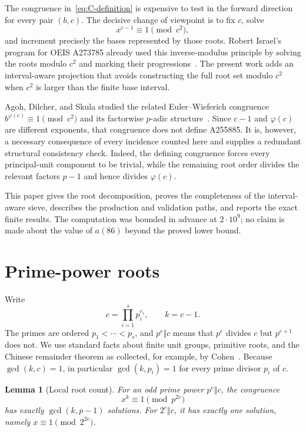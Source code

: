 \documentclass[11pt]{article}
\newtheorem{lemma}[theorem]{Lemma}
\begin{document}
The congruence in~\eqref{eq:C-definition} is expensive to test in the forward
direction for every pair $(b,c)$.  The decisive change of viewpoint is to fix
$c$, solve
\begin{equation}\label{eq:root-congruence}
 x^{c-1}\equiv1\pmod{c^2},
\end{equation}
and increment precisely the bases represented by those roots.  Robert
Israel's program for OEIS A273785 already used this inverse-modulus principle
by solving the roots modulo $c^2$ and marking their progressions~\cite{oeis-a273785}.
The present work adds an interval-aware projection that avoids constructing
the full root set modulo $c^2$ when $c^2$ is larger than the finite base
interval.

Agoh, Dilcher, and Skula studied the related Euler--Wieferich congruence
$b^{\varphi(c)}\equiv1\pmod{c^2}$ and its factorwise $p$-adic
structure~\cite{agoh-dilcher-skula}.  Since $c-1$ and $\varphi(c)$ are
different exponents, that congruence does not define A255885.  It is,
however, a necessary consequence of every incidence counted here and supplies
a redundant structural consistency check.  Indeed, the defining congruence
forces every principal-unit component to be trivial, while the remaining
root order divides the relevant factors $p-1$ and hence divides
$\varphi(c)$.

This paper gives the root decomposition, proves the completeness of the
interval-aware sieve, describes the production and validation paths, and
reports the exact finite results.  The computation was bounded in advance at
$2\cdot10^9$; no claim is made about the value of $a(86)$ beyond the proved
lower bound.

\section{Prime-power roots}

Write
\[
 c=\prod_{i=1}^s p_i^{e_i},\qquad k=c-1.
\]
The primes are ordered $p_1<\cdots<p_s$, and $p^e\Vert c$ means that $p^e$
divides $c$ but $p^{e+1}$ does not.  We use standard facts about finite unit
groups, primitive roots, and the Chinese remainder theorem as collected, for
example, by Cohen~\cite{cohen}.
Because $\gcd(k,c)=1$, in particular $\gcd(k,p_i)=1$ for every prime divisor
$p_i$ of $c$.

\begin{lemma}[Local root count]\label{lem:local-roots}
For an odd prime power $p^e\Vert c$, the congruence
\[
 x^k\equiv1\pmod{p^{2e}}
\]
has exactly $\gcd(k,p-1)$ solutions.  For $2^e\Vert c$, it has exactly one
solution, namely $x\equiv1\pmod{2^{2e}}$.
\end{lemma}
\end{document}
